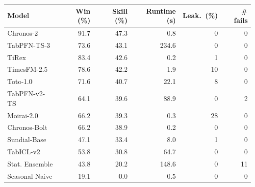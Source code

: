 \begin{tabular}{lrrrrr}
\toprule
\textbf{Model} & \textbf{Win (\%)} & \textbf{Skill (\%)} & \textbf{Runtime (s)} & \textbf{Leak.\ (\%)} & \textbf{\# fails} \\
\midrule
Chronos-2      & 91.7 & 47.3 & 0.8   & 0  & 0 \\
\textcolor{PriorMauve}{TabPFN-TS-3}    & 73.6 & 43.1 & 234.6 & 0  & 0 \\
TiRex          & 83.4 & 42.6 & 0.2   & 1  & 0 \\
TimesFM-2.5    & 78.6 & 42.2 & 1.9   & 10 & 0 \\
Toto-1.0       & 71.6 & 40.7 & 22.1  & 8  & 0 \\
\textcolor{PriorMauve}{TabPFN-v2-TS}   & 64.1 & 39.6 & 88.9  & 0  & 2 \\
Moirai-2.0     & 66.2 & 39.3 & 0.3   & 28 & 0 \\
Chronos-Bolt   & 66.2 & 38.9 & 0.2   & 0  & 0 \\
Sundial-Base   & 47.1 & 33.4 & 8.0   & 1  & 0 \\
TabICL-v2      & 53.8 & 30.8 & 64.7  & 0  & 0 \\
Stat. Ensemble & 43.8 & 20.2 & 148.6 & 0  & 11 \\
Seasonal Naive & 19.1 & 0.0  & 0.5   & 0  & 0 \\
\bottomrule
\end{tabular}
